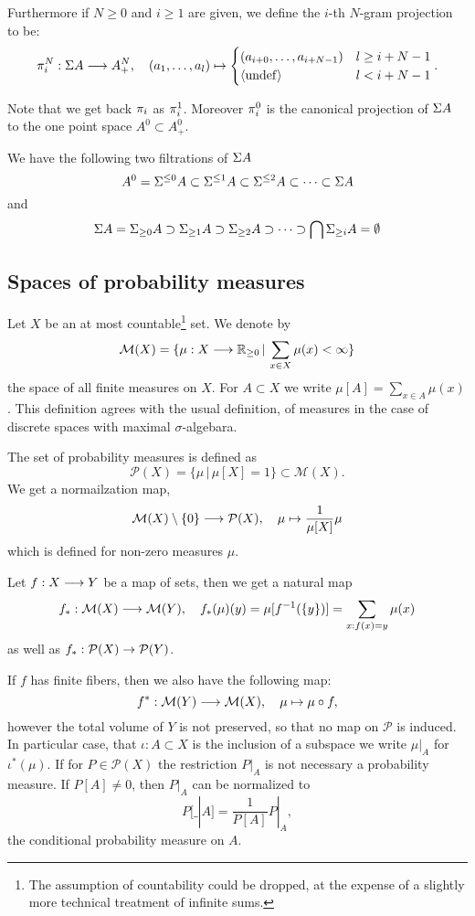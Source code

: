 \documentclass[11pt]{article}
\begin{document}
Furthermore if $N \geq 0$ and $i \geq 1$ are given, we define the $i$-th $N$-gram
projection to be:
\[ {\pi_{i}^{N}}: \Sigma A \longrightarrow A^N_+, \quad (a_1, \dots, a_l) \mapsto
\begin{cases}
(a_{i+0},\dots,a_{i+N-1})  & l \geq i+N-1  \\
\langle \mathrm{undef} \rangle                   & l < i+N-1
\end{cases}.\]

Note that we get back ${\pi_{i}}$ as ${\pi_{i}^{1}}$. Moreover ${\pi_{i}^{0}}$ is the
canonical projection of $\Sigma A$ to the one point space $A^0 \subset
A^0_+$.

We have the following two filtrations of $\Sigma A$
\[ A^0 = \Sigma^{\leq 0} A \subset \Sigma^{\leq 1} A \subset \Sigma^{\leq
  2} A \subset \dots \subset \Sigma A \]
and 
\[ \Sigma A = \Sigma_{\geq 0} A \supset \Sigma_{\geq 1} A \supset \Sigma_{\geq
  2} A \supset \dots \supset \bigcap \Sigma_{\geq i} A = \emptyset  \]

\subsection{Spaces of probability measures}
\label{sec-1-2}

\newcommand{\MES}{\mathcal{M}}  %
\newcommand{\PROB}{\mathcal{P}}  %
\newcommand{\EXP}[2]{E_{#1}[#2]} %

Let $X$ be an at most countable\footnote{The assumption of
  countability could be dropped, at the expense of a slightly more
  technical treatment of infinite sums.} set. We denote by
\[ 
   \MES(X) = \{ \mu: X \lra \IR_{\geq 0} \,|\, \sum_{x \in X} \mu(x) <
\infty \}
\]
the space of all finite measures on $X$. For $A \subset X$ we write
$\mu[A] = \sum_{x \in A} \mu(x)$. This definition agrees with the
usual definition, of measures in the case of discrete spaces with
maximal $\sigma$-algebara.

The set of probability measures is defined as
\[ \PROB(X) = \{ \mu  \,|\,  \mu[X] = 1 \} \subset \MES(X). \]
We get a normailzation map,
\[ \MES (X) \setminus \{0\} \lra \PROB (X), \quad \mu \mapsto
\frac{1}{\mu[X]} \mu \]
which is defined for non-zero measures $\mu$.

Let $f:X \longrightarrow Y$ be a map of sets, then we get a natural map
\[ f_*: \MES(X) \lra \MES(Y), \quad
   f_*(\mu)(y) = \mu[ f^{-1}(\{y\})] = \sum_{x:f(x)=y} \mu(x) \]
as well as $f_*: \PROB(X) \ra \PROB(Y)$.

If $f$ has finite fibers, then we also have the following map:
\[ f^*: \MES(Y) \lra \MES(X), \quad \mu \mapsto \mu \circ f, \]
however the total volume of $Y$ is not preserved, so that no map on
$\PROB$ is induced. In particular case, that $\iota: A \subset X$ is
the inclusion of a subspace we write $\mu|_A$ for $\iota^*(\mu)$.  If
for $P\in \PROB(X)$ the restriction $P|_{A}$ is not necessary a
probability measure. If $P[A] \neq 0$, then $P|_A$ can be normalized
to \[ P[\_|A]=\frac{1}{P[A]}P|_A,\] the conditional probability
measure on $A$.
\end{document}
